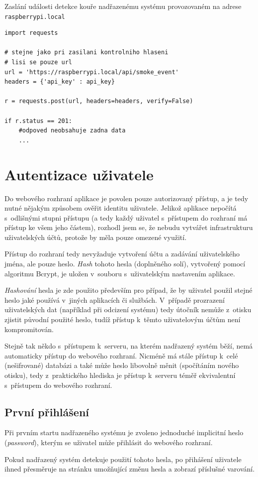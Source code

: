 \begin{listing}[htbp]
\caption{\label{lst:api_report} Zaslání události detekce kouře nadřazenému systému provozovaném na adrese \texttt{raspberrypi.local}}
\begin{verbatim}
import requests

# stejne jako pri zasilani kontrolniho hlaseni
# lisi se pouze url
url = 'https://raspberrypi.local/api/smoke_event'
headers = {'api_key' : api_key}

r = requests.post(url, headers=headers, verify=False)

if r.status == 201:
    #odpoved neobsahuje zadna data
    ...

\end{verbatim}
\end{listing}

\section{Autentizace uživatele}
\label{sec:de_auth}

Do webového rozhraní aplikace je povolen pouze autorizovaný přístup, a je tedy nutné nějakým způsobem ověřit identitu uživatele. Jelikož aplikace nepočítá s~odlišnými stupni přístupu (a tedy každý uživatel s~přístupem do rozhraní má přístup ke všem jeho částem), rozhodl jsem se, že nebudu vytvářet infrastrukturu uživatelských účtů, protože by měla pouze omezené využití.

Přístup do rozhraní tedy nevyžaduje vytvoření účtu a zadávání uživatelského jména, ale pouze heslo. \textit{Hash} tohoto hesla (doplněného solí), vytvořený pomocí algoritmu Bcrypt, je uložen v~souboru s~uživatelským nastavením aplikace.

\textit{Hashování} hesla je zde použito především pro případ, že by uživatel použil stejné heslo jaké používá v~jiných aplikacích či službách. V~případě prozrazení uživatelských dat (například při odcizení systému) tedy útočník nemůže z~otisku zjistit původní použité heslo, tudíž přístup k~těmto uživatelovým účtům není kompromitován.

Stejně tak někdo s~přístupem k~serveru, na kterém nadřazený systém běží, nemá automaticky přístup do webového rozhraní. Nicméně má stále přístup k~celé (nešifrované) databázi a také může heslo libovolně měnit (spočítáním nového otisku), tedy z~praktického hlediska je přístup k~serveru téměř ekvivalentní s~přístupem do webového rozhraní.

\subsection{První přihlášení}

Při prvním startu nadřazeného systému je zvoleno jednoduché implicitní heslo (\textit{password}), kterým se uživatel může přihlásit do webového rozhraní. 

Pokud nadřazený systém detekuje použití tohoto hesla, po přihášení uživatele ihned přesměruje na stránku umožňující změnu hesla a zobrazí příslušné varování.